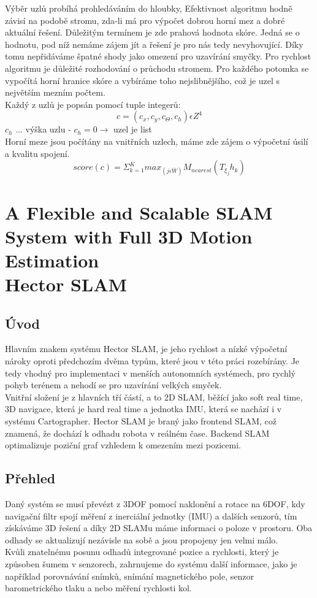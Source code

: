 \documentclass[11pt]{article}
\begin{document}
\indent Výběr uzlů probíhá prohledáváním do hloubky, Efektivnost algoritmu hodně závisí na podobě stromu, zda-li má pro výpočet dobrou horní mez a dobré aktuální řešení. Důležitým termínem je zde prahová hodnota skóre. Jedná se o hodnotu, pod níž nemáme zájem jít a řešení je pro nás tedy nevyhovující. Díky tomu nepřidáváme špatné shody jako omezení pro uzavírání smyčky. Pro rychlost algoritmu je důležité rozhodování o průchodu stromem. Pro každého potomka se vypočítá horní hranice skóre a vybíráme toho nejslibnějšího, což je uzel s největším mezním počtem.\\
\indent Každý z uzlů je popsán pomocí tuple integerů: 
$$c=(c_x,c_y,c_\Theta,c_h)\epsilon Z^4$$
$c_h$ ... výška uzlu - $c_h=0 \rightarrow$ uzel je list\\
\indent Horní meze jsou počítány na vnitřních uzlech, máme zde zájem o výpočetní úsilí a kvalitu spojení. 
$$score(c)=\Sigma_{k=1}^Kmax_{(j\epsilon \bar{W})}M_{nearest}(T_{\xi_j}h_k)$$

\newpage

\section{A Flexible and Scalable SLAM System with Full 3D Motion Estimation \\ Hector SLAM}

\subsection{Úvod}
Hlavním znakem systému Hector SLAM, je jeho rychlost a nízké výpočetní nároky oproti předchozím dvěma typům, které jsou v této práci rozebírány. Je tedy vhodný pro implementaci v menších autonomních systémech, pro rychlý pohyb terénem a nehodí se pro uzavírání velkých smyček.\\
\indent Vnitřní složení je z hlavních tří částí, a to 2D SLAM, běžící jako soft real time, 3D navigace, která je hard real time a jednotka IMU, která se nachází i v systému Cartographer. Hector SLAM je braný jako frontend SLAM, což znamená, že dochází k odhadu robota v reálném čase. Backend SLAM optimalizuje poziční graf vzhledem k omezením mezi pozicemi.

\subsection{Přehled}
Daný systém se musí převézt z 3DOF pomocí naklonění a rotace na 6DOF, kdy navigační filtr spojí měření z inerciální jednotky (IMU) a dalších senzorů, tím získáváme 3D řešení a díky 2D SLAMu máme informaci o poloze v prostoru. Oba odhady se aktualizují nezávisle na sobě a jsou propojeny jen velmi málo.\\
\indent Kvůli znatelnému posunu odhadů integrované pozice a rychlosti, který je způsoben šumem v senzorech, zahrnujeme do systému další informace, jako je například porovnávání snímků, snímání magnetického pole, senzor barometrického tlaku a nebo měření rychlosti kol.
\end{document}
